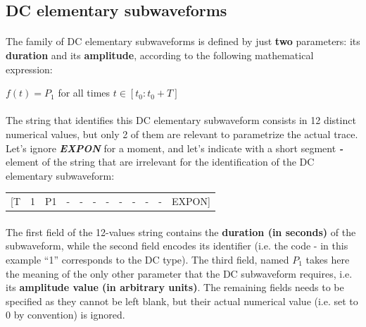 \subsection{DC elementary subwaveforms}
\paragraph{}
The family of DC elementary subwaveforms is defined by just \textbf{two} parameters: its \textbf{duration} and its
\textbf{amplitude}, according to the following mathematical expression:
\begin{center}
$ f(t) = P_1$ for all times $t \in [t_0:t_0 + T]$
\end{center}

\paragraph{}
The string that identifies this DC elementary subwaveform consists in 12 distinct numerical values, but only 2 of them
are relevant to parametrize the actual trace. Let's ignore \textbf{\textit{EXPON}} for a moment, and let's indicate
with a short segment \textbf{\textit{{}-}} element of the string that are irrelevant for the identification of the DC
elementary subwaveform:

\begin{center}
\footnotesize\ttfamily
\begin{tabular}{rrrrrrrrrrrr}
[T & 1 & P1 & - & - & - & - & - & - & - & - & EXPON]
\end{tabular}
\end{center}

\paragraph{}
The first field of the 12-values string contains the \textbf{duration (in seconds)} of the subwaveform, while the second
field encodes its identifier (i.e. the code - in this example ``1'' corresponds to the DC type). The third field, named
\textbf{$P_1$} takes here the meaning of the only other parameter that the DC
subwaveform requires, i.e. its \textbf{amplitude value (in arbitrary units)}. The remaining fields needs to be
specified as they cannot be left blank, but their actual numerical value (i.e. set to 0 by convention) is ignored.

